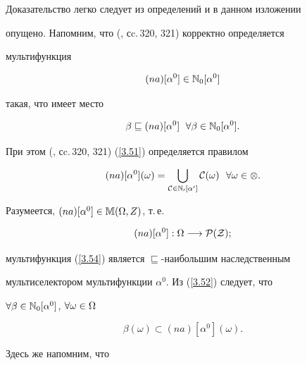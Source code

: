 Доказательство легко следует из определений и в данном изложении


опущено. Напомним, что (\cite{55}, сc.\,320, 321) корректно определяется


мультифункция


\begin{equation}\label{3.51}


(na)[{{\alpha}^0}] \in {{\Bbb{N}}_0}[{\alpha}^0]


\end{equation}


такая, что имеет место


\begin{equation}\label{3.52}


\beta \sqsubseteq (na)[{\alpha}^0] \ \; \fo{\beta} \in


{{\Bbb{N}}_0}[{\alpha}^0].


\end{equation}


При этом (\cite{55}, сc.\,320, 321) (\ref{3.51}) определяется правилом


\begin{equation}\label{3.53}


(na)[{\alpha}^0](\omega) = \bigcup\limits_{\cal{C} \in


{{\Bbb{N}}_0}[{\alpha}^0]}\cal{C}(\omega)\ \ \fo{\omega}\in \Om.


\end{equation}


Разумеется, $(na)[{\alpha}^0] \in \Bbb{M}(\Omega,Z)$, т.\,е.


\begin{equation}\label{3.54}


(na)[{\alpha}^0]:\Om \lo \cal{P}(Z);


\end{equation}


мультифункция (\ref{3.54}) является $\sqsubseteq$-наибольшим наследственным


мультиселектором мультифункции ${\alpha}^0$. Из (\ref{3.52}) следует, что


$\forall{\beta} \in {{\Bbb{N}}_0}[{\alpha}^0]$, $\forall{\omega} \in \Omega$


\begin{equation}\label{3.55}


{{\beta}(\omega)} \subset (na)[{\alpha}^0](\omega).


\end{equation}


Здесь же напомним, что


